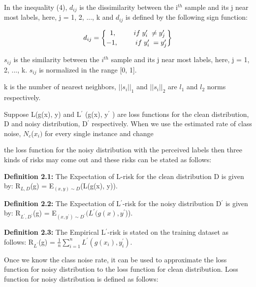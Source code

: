 \documentclass{article}
\begin{document}
		In the inequality (4), $d_{ij}$ 
		is the dissimilarity between the i$^{th}$ sample and its j near most labels, here, j = 1, 2, ..., k and $d_{ij}$ is defined by the following sign function:

		\newcommand*{\bfrac}[2]{\genfrac{\lbrace}{\rbrace}{0pt}{}{#1}{#2}}
			\[
			d_{ij} = \bfrac{\; 1, \;\;\;\;\;\; \; \; \; if \;  y_i^{\prime} \;\neq y_j^{\prime}}{-1, \;\;\;\;\;\; \; \; \; if \;  y_i^{\prime} \;= y_j^{\prime}}
			\]

		

		$s_{ij}$ is the similarity between the $i^{th}$ sample and its j near most labels, here, j = 1, 2, ..., k. $s_{ij}$ is normalized in the range [0, 1].
		
		\hspace{0.1em}k is the number of nearest neighbors, $||s_i||_1$ and $||s_i||_2$ are $l_1$ and $l_2$ norms respectively.
		
		\hspace{0.1em}Suppose L(g(x), y) and L$^{\prime}$ (g(x), y$^{\prime}$
		) are loss functions for the clean distribution, D and noisy distribution,
		D$^{\prime}$ respectively. When we use the estimated rate of class noise, $N_c$($x_i)$ for every single instance and change
		
		
		
		
		\newpage
		
		the loss function for the noisy distribution with the perceived labels then three kinds of risks may come out and these risks can be stated as follows:
		
		\hspace{0.1em}\textbf{Definition 2.1:} The Expectation of L-risk for the clean distribution D is given by: R$_{L,D}$(g) = E$_{(x,y) \sim D}$(L(g(x), y)).
		
		\hspace{0.1em}\textbf{Definition 2.2:} The Expectation of L$^{\prime}$-risk for the noisy distribution D$^{\prime}$ is given by: R$_{L^{\prime},D^{\prime}}$(g) = E$_{(x,y^{\prime}) \sim D^{\prime}} (L^{\prime}(g(x), y^{\prime}$)).
		
		\hspace{0.1em}\textbf{Definition 2.3:} The Empirical L$^{\prime}$-risk is stated on the training dataset as follows: R$_{L^\prime}$(g) = $\frac {1}{n} \sum_{i=1}^{n} L^{\prime}(g(x_i), y_i^{\prime})$.

		\hspace{0.1em}Once we know the class noise rate, it can be used to approximate the loss function for noisy distribution to the loss function for clean distribution. Loss function for noisy distribution is defined as follows: 
		
\end{document}
